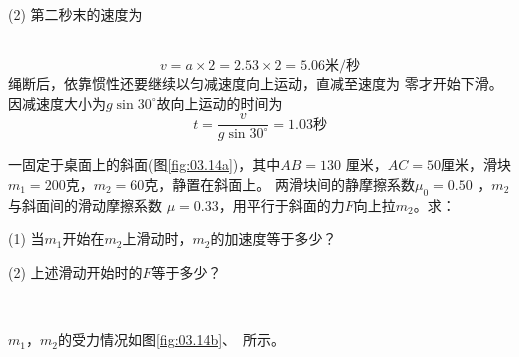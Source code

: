 (2) 第二秒末的速度为

~\vspace{-1.56em}
\begin{equation*}
  v = a \times 2 = 2 . 5 3 \times 2 = 5 . 0 6 \text{米/秒}
\end{equation*}
绳断后，依靠惯性还要继续以匀减速度向上运动，直减至速度为
零才开始下滑。因减速度大小为$  g \sin 3 0 ^ { \circ } $故向上运动的时间为
\begin{equation*}
  t = \frac { v } { g \sin 3 0 ^ { \circ } } = 1 . 0 3\text{秒}
\end{equation*}

\example 一固定于桌面上的斜面(图\ref{fig:03.14a})，其中$  A B = 1 3 0  $
厘米，$  A C = 5 0  $厘米，滑块$  m _ { 1 } = 2 0 0  $克，$  m _ { 2 } = 6 0  $克，静置在斜面上。
两滑块间的静摩擦系数$  \mu _ { 0 } = 0 . 5 0 $ ，$m_2$与斜面间的滑动摩擦系数
$ \mu = 0 . 3 3  $，用平行于斜面的力$ F $向上拉$m_2$。求：

(1) 当$m_1$开始在$m_2$上滑动时，$m_2$的加速度等于多少？

(2) 上述滑动开始时的$ F $等于多少？
\begin{figurex}
  \centering
  \\[-0.5em]
   \qquad
  \caption{}
  \label{fig:03.14}
\end{figurex}

\solution $m_1$，$m_2$的受力情况如图\ref{fig:03.14b}、~所示。

